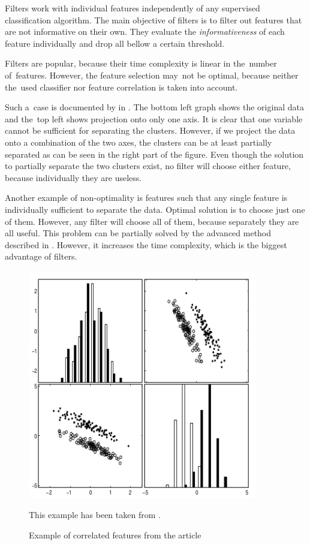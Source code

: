 Filters work with individual features independently of any supervised classification algorithm.
The main objective of filters is to filter out features that are not informative on their own.
They evaluate the \textit{informativeness} of each feature individually
and drop all bellow a certain threshold.

Filters are popular, because their time complexity is linear in the~number of~features.
However, the feature selection may~not be optimal,
because neither the~used classifier nor feature correlation is taken into account.

Such a~case is documented by \citet{GuyEli03} in .
The bottom left graph shows the original data and the~top left shows projection onto only one axis.
It is clear that one variable cannot be sufficient for separating the clusters.
However, if we project the data onto a combination of the two axes,
the clusters can be at least partially separated as can be seen in the right part of the figure.
Even though the solution to partially separate the two clusters exist,
no filter will choose either feature, because individually they are useless.

Another example of non-optimality is
features such that any single feature is individually sufficient to separate the data.
Optimal solution is  to choose just one of them.
However, any filter will choose all of them, because separately they are all useful.
This problem can be partially solved by the advanced method described in .
However, it increases the time complexity, which is the biggest advantage of filters.

 

\begin{figure}[ht]\centering
\includegraphics[width=100mm]{../img/guyeli_figure3.png}
\caption{Example of correlated features from the article}
This example has been taken from \citet{GuyEli03}.
\label{fig:guyeli03-figure3}
\end{figure}

